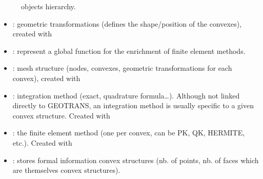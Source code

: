 \documentclass[a4paper,11pt,english]{sphinxmanual}
\begin{document}
\begin{figure}[htbp]
\centering
\capstart

\noindent{}
\caption{ objects hierarchy.}\label{\detokenize{scilab/scilabgf:id1}}\label{\detokenize{scilab/scilabgf:scilab-fig-hierarchy}}\end{figure}
\begin{itemize}
\item {} 
\sphinxAtStartPar
{}: geometric transformations (defines the shape/position of
the convexes), created with 

\item {} 
\sphinxAtStartPar
{}: represent a global function for the enrichment of finite element methods.

\item {} 
\sphinxAtStartPar
{} : mesh structure (nodes, convexes, geometric transformations for
each convex), created with 

\item {} 
\sphinxAtStartPar
{} : integration method (exact, quadrature formula…).  Although
not linked directly to GEOTRANS, an integration method is usually specific to a
given convex structure. Created with 

\item {} 
\sphinxAtStartPar
{} : the finite element method (one per convex, can be PK, QK,
HERMITE, etc.). Created with 

\item {} 
\sphinxAtStartPar
{} : stores formal information convex structures (nb. of points,
nb. of faces which are themselves convex structures).


\end{itemize}
\end{document}
